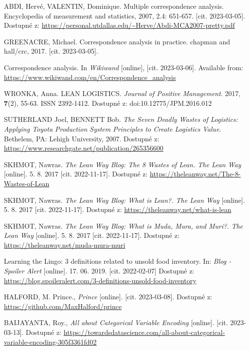 \begin{thebibliography}{1}
ABDI, Hervé, VALENTIN, Dominique. Multiple correspondence analysis. Encyclopedia of measurement and statistics, 2007, 2.4: 651-657. [cit. 2023-03-05]. Dostupné z: \url{https://personal.utdallas.edu/\~Herve/Abdi-MCA2007-pretty.pdf}

GREENACRE, Michael. Correspondence analysis in practice. chapman and hall/crc, 2017. [cit. 2023-03-05]. 

Correspondence analysis. In \textit{Wikiwand} [online], [cit. 2023-03-06]. Available from: \url{https://www.wikiwand.com/en/Correspondence\_analysis}

WRONKA, Anna. LEAN LOGISTICS. \textit{Journal of Positive Management}. 2017, \textbf{7}(2), 55-63. ISSN 2392-1412. Dostupné z: doi:10.12775/JPM.2016.012

SUTHERLAND Joel, BENNETT Bob. \textit{The Seven Deadly Wastes of Logistics: Applying Toyota Production System Principles to Create Logistics Value}. Bethelem, PA: Lehigh University, 2007. Dostupné z: \url{https://www.researchgate.net/publication/265356600}

SKHMOT, Nawras. \textit{The Lean Way Blog: The 8 Wastes of Lean. The Lean Way} [online]. 5. 8. 2017 [cit. 2022-11-17]. Dostupné z: \url{https://theleanway.net/The-8-Wastes-of-Lean}

SKHMOT, Nawras. \textit{The Lean Way Blog: What is Lean?. The Lean Way} [online]. 5. 8. 2017 [cit. 2022-11-17]. Dostupné z: \url{https://theleanway.net/what-is-lean}

SKHMOT, Nawras. \textit{The Lean Way Blog: What is Muda, Mura, and Muri?. The Lean Way} [online]. 5. 8. 2017 [cit. 2022-11-17]. Dostupné z:
 \url{https://theleanway.net/muda-mura-muri}

Learning the Lingo: 3 definitions related to unsold food inventory. In: \textit{Blog - Spoiler Alert} [online]. 17. 06. 2019. [cit. 2022-02-07] Dostupné z: \url{https://blog.spoileralert.com/3-definitions-unsold-food-inventory}

HALFORD, M. Prince., \textit{Prince} [online]. [cit. 2023-03-08]. Dostupné z: \url{https://github.com/MaxHalford/prince}

BAIJAYANTA, Roy., \textit{All about Categorical Variable Encoding } [online]. [cit. 2023-03-13]. Dostupné z: \url{https://towardsdatascience.com/all-about-categorical-variable-encoding-305f3361fd02}




\end{thebibliography}
	

	
	